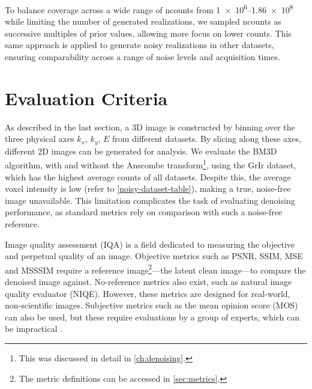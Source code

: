 To balance coverage across a wide range of \gls{ncounts} from \numrange{1e6}{1.86e8} while limiting the number of generated realizations, we sampled \gls{ncounts} as successive multiples of prior values, allowing more focus on lower counts. This same approach is applied to generate noisy realizations in other datasets, ensuring comparability across a range of noise levels and acquisition times.

\section{Evaluation Criteria}
As described in the last section, a 3D image is constructed by binning over the three physical axes $k_x$, $k_y$, $E$ from different datasets. By slicing along these axes, different 2D images can be generated for analysis. We evaluate the \gls{BM3D} algorithm, with and without the Anscombe transform\footnote{This was discussed in detail in \cref{ch:denoising}.}, using the \gls{GrIr} dataset, which has the highest average counts of all datasets. Despite this, the average voxel intensity  is low (refer to \cref{noisy-dataset-table}), making a true, noise-free image unavailable. This limitation complicates the task of evaluating denoising performance, as standard metrics rely on comparison with such a noise-free reference.

Image quality assessment (IQA) is a field dedicated to measuring the objective and perpetual  quality of an image. Objective metrics such as \gls{PSNR}, \gls{SSIM}, \gls{MSE} and \gls{MSSSIM} require a reference image\footnote{The metric definitions can be accessed in \cref{sec:metrics}.}---the latent  clean image---to compare the denoised image against. No-reference metrics also exist, such as natural image quality evaluator (NIQE). However, these metrics are designed for real-world, non-scientific  images. Subjective metrics such as the mean opinion score (MOS) can also be used, but these require evaluations by a group of experts, which can be impractical \cite{eskiciogluImageQualityMeasures1995,linzhangFSIMFeatureSimilarity2011}.

